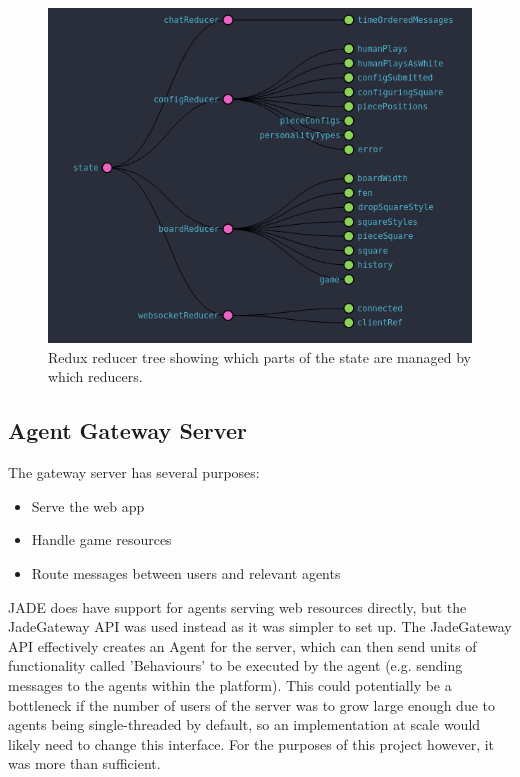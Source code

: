 \documentclass{article}
\begin{document}
\begin{figure}[!ht]
	\centering
	\includegraphics[width=\linewidth]{images/reducers}
	\caption{Redux reducer tree showing which parts of the state are managed by which reducers.}
	\label{fig:reducers}
\end{figure}

\subsection{Agent Gateway Server}

The gateway server has several purposes: 
\begin{itemize}
	\item{Serve the web app}
	\item{Handle game resources}
	\item{Route messages between users and relevant agents}
\end{itemize}


JADE does have support for agents serving web resources directly, but the JadeGateway API was used instead as it was simpler to set up. The JadeGateway API effectively creates an Agent for the server, which can then send units of functionality called 'Behaviours' to be executed by the agent (e.g. sending messages to the agents within the platform). This could potentially be a bottleneck if the number of users of the server was to grow large enough due to agents being single-threaded by default, so an implementation at scale would likely need to change this interface. For the purposes of this project however, it was more than sufficient.
\end{document}
